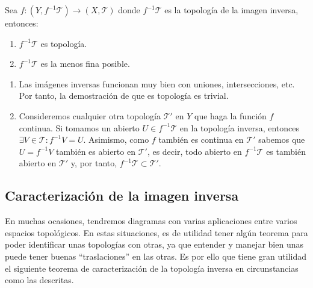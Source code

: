 \begin{prop}
Sea $f: (Y, f^{-1}\mathcal{T}) \rightarrow (X,\mathcal{T})$ donde $f^{-1}\mathcal{T}$ es la topología de la imagen inversa, entonces:
\begin{enumerate}
    \item $f^{-1}\mathcal{T}$ es topología. 
    \item $f^{-1}\mathcal{T}$ es la menos fina posible.
\end{enumerate}
\end{prop}
\begin{demo}
\begin{enumerate}
    \item Las imágenes inversas funcionan muy bien con uniones, intersecciones, etc. Por tanto, la demostración de que es topología es trivial.
    
    \item Consideremos cualquier otra topología $\mathcal{T}'$ en $Y$ que haga la función $f$ continua. Si tomamos un abierto $U \in f^{-1}\mathcal{T}$ en la topología inversa, entonces $\exists V \in \mathcal{T}: f^{-1}V = U$. Asimismo, como $f$ también es continua en $\mathcal{T}'$ sabemos que $U = f^{-1}V$ también es abierto en $\mathcal{T}'$, es decir, todo abierto en $f^{-1}\mathcal{T}$ es también abierto en $\mathcal{T}'$ y, por tanto, $f^{-1}\mathcal{T} \subset \mathcal{T}'$.
\end{enumerate}
\end{demo}

\subsection{Caracterización de la imagen inversa}
\label{sub:caracterizacion_de_la_imagen_inversa}
En muchas ocasiones, tendremos diagramas con varias aplicaciones entre varios espacios topológicos. En estas situaciones, es de utilidad tener algún teorema para poder identificar unas topologías con otras, ya que entender y manejar bien unas puede tener buenas ``traslaciones'' en las otras. Es por ello que tiene gran utilidad el siguiente teorema de caracterización de la topología inversa en circunstancias como las descritas.

